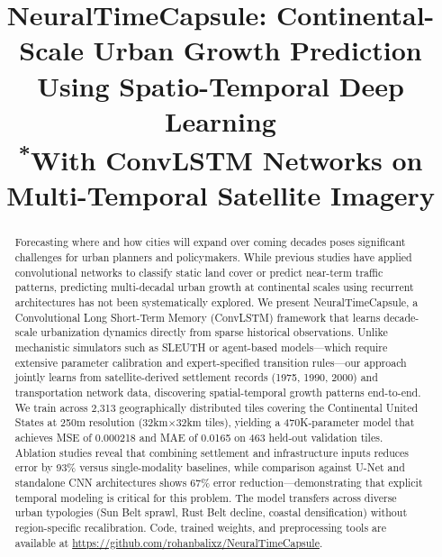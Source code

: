\documentclass[conference]{IEEEtran}
\begin{document}
\title{NeuralTimeCapsule: Continental-Scale Urban Growth Prediction Using Spatio-Temporal Deep Learning\\
{\footnotesize \textsuperscript{*}With ConvLSTM Networks on Multi-Temporal Satellite Imagery}
}

\author{
}

\maketitle

\begin{abstract}
Forecasting where and how cities will expand over coming decades poses significant challenges for urban planners and policymakers. While previous studies have applied convolutional networks to classify static land cover or predict near-term traffic patterns, predicting multi-decadal urban growth at continental scales using recurrent architectures has not been systematically explored. We present NeuralTimeCapsule, a Convolutional Long Short-Term Memory (ConvLSTM) framework that learns decade-scale urbanization dynamics directly from sparse historical observations. Unlike mechanistic simulators such as SLEUTH or agent-based models---which require extensive parameter calibration and expert-specified transition rules---our approach jointly learns from satellite-derived settlement records (1975, 1990, 2000) and transportation network data, discovering spatial-temporal growth patterns end-to-end. We train across 2,313 geographically distributed tiles covering the Continental United States at 250m resolution (32km$\times$32km tiles), yielding a 470K-parameter model that achieves MSE of 0.000218 and MAE of 0.0165 on 463 held-out validation tiles. Ablation studies reveal that combining settlement and infrastructure inputs reduces error by 93\% versus single-modality baselines, while comparison against U-Net and standalone CNN architectures shows 67\% error reduction---demonstrating that explicit temporal modeling is critical for this problem. The model transfers across diverse urban typologies (Sun Belt sprawl, Rust Belt decline, coastal densification) without region-specific recalibration. Code, trained weights, and preprocessing tools are available at \url{https://github.com/rohanbalixz/NeuralTimeCapsule}.
\end{abstract}
\end{document}
